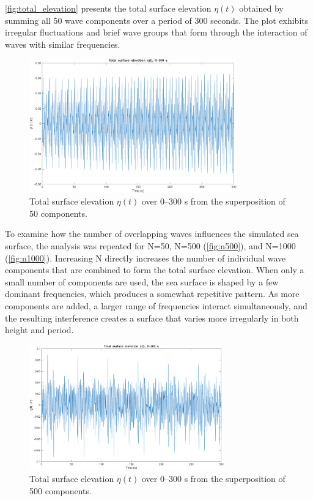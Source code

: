 \documentclass[a4paper, 11pt]{article}
\begin{document}
\autoref{fig:total_elevation} presents the total surface elevation $\eta(t)$ obtained by summing all 50 wave components over a period of 300 seconds. The plot exhibits irregular fluctuations and brief wave groups that form through the interaction of waves with similar frequencies.

\begin{figure}[H]
\centering
\includegraphics[width=0.8\textwidth]{eta_total.png}
\caption{Total surface elevation $\eta(t)$ over 0–300 s from the superposition of 50 components.}
\label{fig:total_elevation}
\end{figure}

To examine how the number of overlapping waves influences the simulated sea surface, the analysis was repeated for N=50, N=500 (\autoref{fig:n500}), and N=1000 (\autoref{fig:n1000}). Increasing N directly increases the number of individual wave components that are combined to form the total surface elevation. When only a small number of components are used, the sea surface is shaped by a few dominant frequencies, which produces a somewhat repetitive pattern. As more components are added, a larger range of frequencies interact simultaneously, and the resulting interference creates a surface that varies more irregularly in both height and period.

\begin{figure}[H]
\centering
\includegraphics[width=0.75\textwidth]{n500.png}
\caption{Total surface elevation $\eta(t)$ over 0–300 s from the superposition of 500 components.}
\label{fig:n500}
\end{figure}
\end{document}
